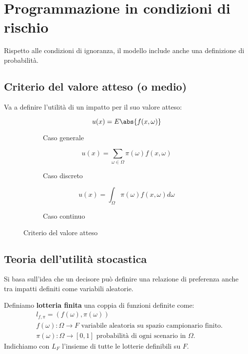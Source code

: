 \documentclass[\main/main.tex]{subfiles}
\begin{document}
\chapter{Programmazione in condizioni di rischio}
Rispetto alle condizioni di ignoranza, il modello include anche una definizione di probabilità.

\section{Criterio del valore atteso (o medio)}
Va a definire l'utilità di un impatto per il suo valore atteso:

\begin{figure}
  \begin{subfigure}{0.31\textwidth}
    \[
      u(x) = E\abs{f(x,\omega)}
    \]
    \caption{Caso generale}
  \end{subfigure}
  \begin{subfigure}{0.31\textwidth}
    \[
      u(x) = \sum_{\omega \in \Omega} \pi(\omega) f(x, \omega)
    \]
    \caption{Caso discreto}
  \end{subfigure}
  \begin{subfigure}{0.31\textwidth}
    \[
      u(x) = \int_{\Omega} \pi(\omega) f(x, \omega) d\omega
    \]
    \caption{Caso continuo}
  \end{subfigure}
  \caption{Criterio del valore atteso}
\end{figure}

\section{Teoria dell'utilità stocastica}
Si basa sull'idea che un decisore può definire una relazione di preferenza anche tra impatti definiti come variabili aleatorie.

\begin{definition}[Lotteria]
  Definiamo \textbf{lotteria finita} una coppia di funzioni definite come:
  \begin{align*}
     & l_{f, \pi} = (f(\omega), \pi(\omega))                                                     \\
     & f(\omega): \Omega \rightarrow F \text{ variabile aleatoria su spazio campionario finito.} \\
     & \pi(\omega): \Omega \rightarrow [0,1] \text{ probabilità di ogni scenario in $\Omega$.}
  \end{align*}
  Indichiamo con $L_F$ l'insieme di tutte le lotterie definibili su $F$.
\end{definition}
\end{document}
